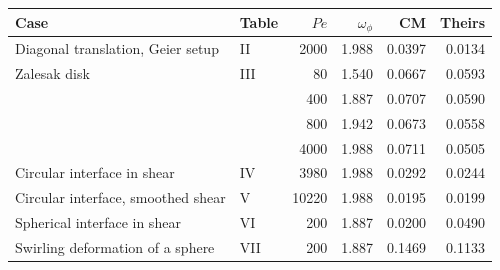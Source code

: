 \begin{tabular}{llrrrr}
\toprule
Case & Table & $Pe$ & $\omega_\phi$ & CM & Theirs \\
\midrule
Diagonal translation, Geier setup & II & 2000 & 1.988 & 0.0397 & 0.0134 \\
Zalesak disk & III & 80 & 1.540 & 0.0667 & 0.0593 \\
 &  & 400 & 1.887 & 0.0707 & 0.0590 \\
 &  & 800 & 1.942 & 0.0673 & 0.0558 \\
 &  & 4000 & 1.988 & 0.0711 & 0.0505 \\
Circular interface in shear & IV & 3980 & 1.988 & 0.0292 & 0.0244 \\
Circular interface, smoothed shear & V & 10220 & 1.988 & 0.0195 & 0.0199 \\
Spherical interface in shear & VI & 200 & 1.887 & 0.0200 & 0.0490 \\
Swirling deformation of a sphere & VII & 200 & 1.887 & 0.1469 & 0.1133 \\
\bottomrule
\end{tabular}
